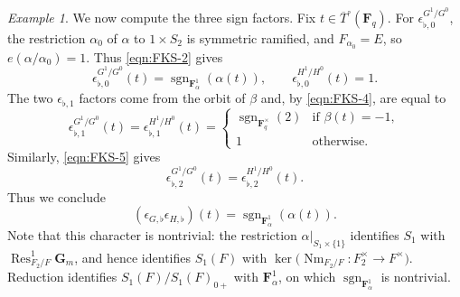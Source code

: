 \documentclass[reqno]{amsart}
\numberwithin{equation}{subsection}
\newcommand{\F}{\mathbf{F}}
\newcommand{\G}{\mathbf{G}}
\newcommand{\sgn}{\operatorname{sgn}}
\newcommand{\ol}[1]{\overline{#1}}
\DeclareMathOperator{\Nm}{Nm}
\DeclareMathOperator{\Res}{Res}
\theoremstyle{remark}
\newtheorem{example}[thm]{Example}
\numberwithin{equation}{subsection}
\numberwithin{figure}{subsection}
\begin{document}
\begin{example}
We now compute the three sign factors. Fix $t\in\ol T^\circ(\F_q)$. For $\epsilon_{\flat,0}^{G^1/G^0}$, the restriction $\alpha_0$ of $\alpha$ to $1\times S_2$ is symmetric ramified, and $F_{\alpha_0}=E$, so $e(\alpha/\alpha_0)=1$. Thus \eqref{eqn:FKS-2} gives
\[
\epsilon_{\flat,0}^{G^1/G^0}(t)=\sgn_{\F_\alpha^1}(\alpha(t)),
\qquad
\epsilon_{\flat,0}^{H^1/H^0}(t)=1.
\]
The two $\epsilon_{\flat,1}$ factors come from the orbit of $\beta$ and, by \eqref{eqn:FKS-4}, are equal to
\[
\epsilon_{\flat,1}^{G^1/G^0}(t)=\epsilon_{\flat,1}^{H^1/H^0}(t)=\begin{cases}
    \sgn_{\F_q^\times}(2) &\text{if } \beta(t)=-1,\\
    1 &\text{otherwise.}
\end{cases}
\]
Similarly, \eqref{eqn:FKS-5} gives
\[
\epsilon_{\flat,2}^{G^1/G^0}(t)=\epsilon_{\flat,2}^{H^1/H^0}(t).
\]
Thus we conclude
\[
(\epsilon_{G,\flat}\epsilon_{H,\flat})(t)=\sgn_{\F_\alpha^1}(\alpha(t)).
\]
Note that this character is nontrivial: the restriction $\alpha|_{S_1\times\{1\}}$ identifies $S_1$ with $\Res^1_{F_2/F}\G_m$, and hence identifies $S_1(F)$ with $\ker\bigl(\Nm_{F_2/F}:F_2^\times\to F^\times\bigr)$. Reduction identifies $S_1(F)/S_1(F)_{0+}$ with $\F_\alpha^1$, on which $\sgn_{\F_\alpha^1}$ is nontrivial.
\end{example}
\end{document}
